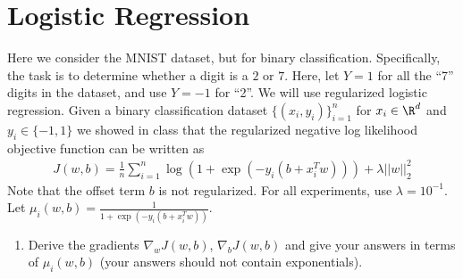 \documentclass{article}
\begin{document}
\section*{Logistic Regression}
\begin{aprob}
    Here we consider the MNIST dataset, but for binary classification. Specifically, the task is to determine whether a digit is a $2$ or $7$.
    Here, let $Y=1$ for all the ``7'' digits in the dataset, and use $Y=-1$ for ``2''.
    We will use regularized logistic regression. 
    Given a binary classification dataset $\{(x_i,y_i)\}_{i=1}^n$ for $x_i \in \R^d$ and $y_i \in \{-1,1\}$ we showed in class that the regularized negative log likelihood objective function can be written as
    \begin{align*}
    J(w,b) = \frac{1}{n} \sum_{i=1}^n \log( 1 + \exp(-y_i (b + x_i^T w))) + \lambda ||w||_2^2
    \end{align*} 
    Note that the offset term $b$ is not regularized. 
    For all experiments, use $\lambda = 10^{-1}$. 
    Let $\mu_i(w,b) = \frac{1}{1+ \exp(-y_i (b + x_i^T w))}$. 
    \begin{enumerate}
        \item {} Derive the gradients $\nabla_w J(w,b)$, $\nabla_{b} J(w,b)$ and give your answers in terms of $\mu_i(w,b)$ (your answers should not contain exponentials).
        

\end{enumerate}
\end{aprob}
\end{document}
